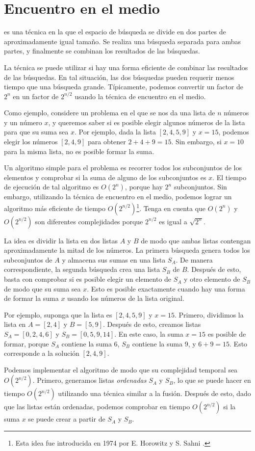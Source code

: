 \section{Encuentro en el medio}


 es una técnica
en la que el espacio de búsqueda se divide en
dos partes de aproximadamente igual tamaño.
Se realiza una búsqueda separada
para ambas partes,
y finalmente se combinan los resultados de las búsquedas.

La técnica se puede utilizar
si hay una forma eficiente de combinar las
resultados de las búsquedas.
En tal situación, las dos búsquedas pueden requerir menos
tiempo que una búsqueda grande.
Típicamente, podemos convertir un factor de $2^n$
en un factor de $2^{n/2}$ usando la técnica de encuentro en el
medio.

Como ejemplo, considere un problema en el que
se nos da una lista de $n$ números y
un número $x$,
y queremos saber si es posible
elegir algunos números de la lista para que
su suma sea $x$.
Por ejemplo, dada la lista $[2,4,5,9]$ y $x=15$,
podemos elegir los números $[2,4,9]$ para obtener $2+4+9=15$.
Sin embargo, si $x=10$ para la misma lista,
no es posible formar la suma.

Un algoritmo simple para el problema es
recorrer todos los subconjuntos de los elementos y
comprobar si la suma de alguno de los subconjuntos es $x$.
El tiempo de ejecución de tal algoritmo es $O(2^n)$,
porque hay $2^n$ subconjuntos.
Sin embargo, utilizando la técnica de encuentro en el medio,
podemos lograr un algoritmo más eficiente de tiempo $O(2^{n/2})$\footnote{Esta
idea fue introducida en 1974 por E. Horowitz y S. Sahni \cite{hor74}.}.
Tenga en cuenta que $O(2^n)$ y $O(2^{n/2})$ son diferentes
complejidades porque $2^{n/2}$ es igual a $\sqrt{2^n}$.

La idea es dividir la lista en
dos listas $A$ y $B$ de modo que ambas
listas contengan aproximadamente la mitad de los números.
La primera búsqueda genera todos los subconjuntos
de $A$ y almacena sus sumas en una lista $S_A$.
De manera correspondiente, la segunda búsqueda crea
una lista $S_B$ de $B$.
Después de esto, basta con comprobar si es posible
elegir un elemento de $S_A$ y otro
elemento de $S_B$ de modo que su suma sea $x$.
Esto es posible exactamente cuando hay una forma de
formar la suma $x$ usando los números de la lista original.

Por ejemplo, suponga que la lista es $[2,4,5,9]$ y $x=15$.
Primero, dividimos la lista en $A=[2,4]$ y $B=[5,9]$.
Después de esto, creamos listas
$S_A=[0,2,4,6]$ y $S_B=[0,5,9,14]$.
En este caso, la suma $x=15$ es posible de formar,
porque $S_A$ contiene la suma $6$,
$S_B$ contiene la suma $9$, y $6+9=15$.
Esto corresponde a la solución $[2,4,9]$.

Podemos implementar el algoritmo de modo que
su complejidad temporal sea $O(2^{n/2})$.
Primero, generamos listas \emph{ordenadas} $S_A$ y $S_B$,
lo que se puede hacer en tiempo $O(2^{n/2})$ utilizando una técnica similar a la fusión.
Después de esto, dado que las listas están ordenadas,
podemos comprobar en tiempo $O(2^{n/2})$ si
la suma $x$ se puede crear a partir de $S_A$ y $S_B$.
